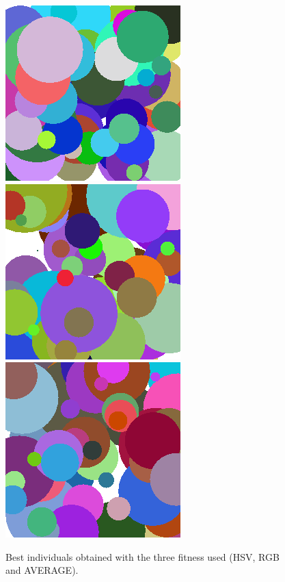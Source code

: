 {\begin{figure}
\centering
   \includegraphics[scale =0.5] {gfx/art/RGB.png}
   \includegraphics[scale =0.5] {gfx/art/HSV.png}
   \includegraphics[scale =0.5] {gfx/art/AVERAGE.png}
\caption{Best individuals obtained with the three fitness used (HSV, RGB and AVERAGE).}
\label{fig:bestinds}
\end{figure}

}
